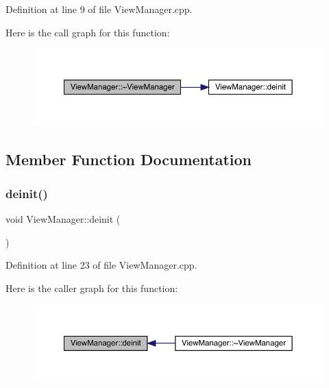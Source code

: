 Definition at line 9 of file View\+Manager.\+cpp.

Here is the call graph for this function\+:
\nopagebreak
\begin{figure}[H]
\begin{center}
\leavevmode
\includegraphics[width=350pt]{class_view_manager_ad80032be506a890da62d887f1c9c050c_cgraph}
\end{center}
\end{figure}


\subsection{Member Function Documentation}
\mbox{\label{class_view_manager_a11d585d66a93b18c1c8c7eceaefb2649}} 
\subsubsection{\texorpdfstring{deinit()}{deinit()}}
{\footnotesize\ttfamily void View\+Manager\+::deinit (\begin{DoxyParamCaption}{ }\end{DoxyParamCaption})}



Definition at line 23 of file View\+Manager.\+cpp.

Here is the caller graph for this function\+:
\nopagebreak
\begin{figure}[H]
\begin{center}
\leavevmode
\includegraphics[width=350pt]{class_view_manager_a11d585d66a93b18c1c8c7eceaefb2649_icgraph}
\end{center}
\end{figure}
\mbox{\label{class_view_manager_aa8061fbef65c06d1b72cb87673a9bf13}} 
